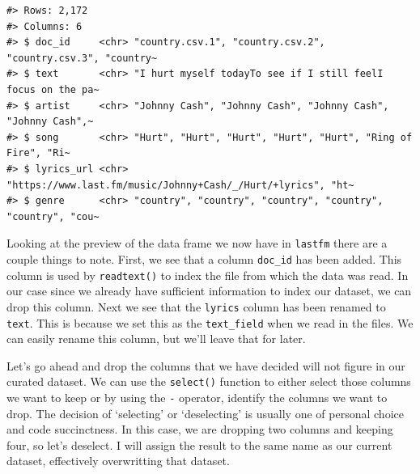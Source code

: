 \documentclass[
]{article}
\newenvironment{Shaded}{\begin{snugshade}}{\end{snugshade}}
\newcommand{\CommentTok}[1]{\textcolor[rgb]{0.56,0.35,0.01}{\textit{#1}}}
\newcommand{\FunctionTok}[1]{\textcolor[rgb]{0.00,0.00,0.00}{#1}}
\newcommand{\NormalTok}[1]{#1}
\newcommand{\OtherTok}[1]{\textcolor[rgb]{0.56,0.35,0.01}{#1}}
\newcommand{\SpecialCharTok}[1]{\textcolor[rgb]{0.00,0.00,0.00}{#1}}
\begin{document}
\begin{verbatim}
#> Rows: 2,172
#> Columns: 6
#> $ doc_id     <chr> "country.csv.1", "country.csv.2", "country.csv.3", "country~
#> $ text       <chr> "I hurt myself todayTo see if I still feelI focus on the pa~
#> $ artist     <chr> "Johnny Cash", "Johnny Cash", "Johnny Cash", "Johnny Cash",~
#> $ song       <chr> "Hurt", "Hurt", "Hurt", "Hurt", "Hurt", "Ring of Fire", "Ri~
#> $ lyrics_url <chr> "https://www.last.fm/music/Johnny+Cash/_/Hurt/+lyrics", "ht~
#> $ genre      <chr> "country", "country", "country", "country", "country", "cou~
\end{verbatim}

Looking at the preview of the data frame we now have in \texttt{lastfm} there are a couple things to note. First, we see that a column \texttt{doc\_id} has been added. This column is used by \texttt{readtext()} to index the file from which the data was read. In our case since we already have sufficient information to index our dataset, we can drop this column. Next we see that the \texttt{lyrics} column has been renamed to \texttt{text}. This is because we set this as the \texttt{text\_field} when we read in the files. We can easily rename this column, but we'll leave that for later.

Let's go ahead and drop the columns that we have decided will not figure in our curated dataset. We can use the \texttt{select()} function to either select those columns we want to keep or by using the \texttt{-} operator, identify the columns we want to drop. The decision of `selecting' or `deselecting' is usually one of personal choice and code succinctness. In this case, we are dropping two columns and keeping four, so let's deselect. I will assign the result to the same name as our current dataset, effectively overwritting that dataset.

\begin{Shaded}
\end{Shaded}
\end{document}

